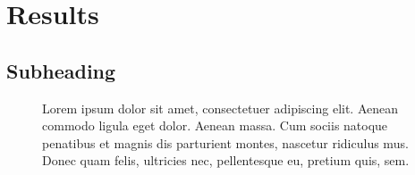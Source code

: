 
\section{Results}


\subsection{Subheading}

\lipsum[1-2]

\begin{figure}[H] %
   \centering
   \caption{Lorem ipsum dolor sit amet, consectetuer adipiscing elit. Aenean
   commodo ligula eget dolor. Aenean massa. Cum sociis natoque penatibus et magnis
   dis parturient montes, nascetur ridiculus mus. Donec quam felis, ultricies nec,
   pellentesque eu, pretium quis, sem.}
\label{fig:test_plot}
\end{figure} %

